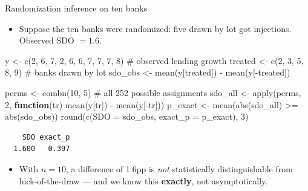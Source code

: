 \documentclass[
  11pt,
  ignorenonframetext,
  aspectratio=169,
]{beamer}
\newenvironment{Shaded}{\begin{snugshade}}{\end{snugshade}}
\newcommand{\AttributeTok}[1]{\textcolor[rgb]{0.40,0.45,0.13}{#1}}
\newcommand{\CommentTok}[1]{\textcolor[rgb]{0.37,0.37,0.37}{#1}}
\newcommand{\ControlFlowTok}[1]{\textcolor[rgb]{0.00,0.23,0.31}{\textbf{#1}}}
\newcommand{\DecValTok}[1]{\textcolor[rgb]{0.68,0.00,0.00}{#1}}
\newcommand{\FunctionTok}[1]{\textcolor[rgb]{0.28,0.35,0.67}{#1}}
\newcommand{\NormalTok}[1]{\textcolor[rgb]{0.00,0.23,0.31}{#1}}
\newcommand{\OtherTok}[1]{\textcolor[rgb]{0.00,0.23,0.31}{#1}}
\newcommand{\SpecialCharTok}[1]{\textcolor[rgb]{0.37,0.37,0.37}{#1}}
\providecommand{\tightlist}{%
  \setlength{\itemsep}{0pt}\setlength{\parskip}{0pt}}
\begin{document}
\begin{frame}[fragile]{Randomization inference on ten banks}
\protect{}\label{randomization-inference-on-ten-banks}
\begin{itemize}
\tightlist
\item
  Suppose the ten banks were randomized: five drawn by lot got
  injections. Observed SDO \(= 1.6\).
\end{itemize}

\begin{Shaded}
\begin{Highlighting}[]
\NormalTok{y }\OtherTok{\textless{}{-}} \FunctionTok{c}\NormalTok{(}\DecValTok{2}\NormalTok{, }\DecValTok{6}\NormalTok{, }\DecValTok{7}\NormalTok{, }\DecValTok{2}\NormalTok{, }\DecValTok{6}\NormalTok{, }\DecValTok{6}\NormalTok{, }\DecValTok{7}\NormalTok{, }\DecValTok{7}\NormalTok{, }\DecValTok{7}\NormalTok{, }\DecValTok{8}\NormalTok{)     }\CommentTok{\# observed lending growth}
\NormalTok{treated }\OtherTok{\textless{}{-}} \FunctionTok{c}\NormalTok{(}\DecValTok{2}\NormalTok{, }\DecValTok{3}\NormalTok{, }\DecValTok{5}\NormalTok{, }\DecValTok{8}\NormalTok{, }\DecValTok{9}\NormalTok{)              }\CommentTok{\# banks drawn by lot}
\NormalTok{sdo\_obs }\OtherTok{\textless{}{-}} \FunctionTok{mean}\NormalTok{(y[treated]) }\SpecialCharTok{{-}} \FunctionTok{mean}\NormalTok{(y[}\SpecialCharTok{{-}}\NormalTok{treated])}

\NormalTok{perms }\OtherTok{\textless{}{-}} \FunctionTok{combn}\NormalTok{(}\DecValTok{10}\NormalTok{, }\DecValTok{5}\NormalTok{)                     }\CommentTok{\# all 252 possible assignments}
\NormalTok{sdo\_all }\OtherTok{\textless{}{-}} \FunctionTok{apply}\NormalTok{(perms, }\DecValTok{2}\NormalTok{, }\ControlFlowTok{function}\NormalTok{(tr) }\FunctionTok{mean}\NormalTok{(y[tr]) }\SpecialCharTok{{-}} \FunctionTok{mean}\NormalTok{(y[}\SpecialCharTok{{-}}\NormalTok{tr]))}
\NormalTok{p\_exact }\OtherTok{\textless{}{-}} \FunctionTok{mean}\NormalTok{(}\FunctionTok{abs}\NormalTok{(sdo\_all) }\SpecialCharTok{\textgreater{}=} \FunctionTok{abs}\NormalTok{(sdo\_obs))}
\FunctionTok{round}\NormalTok{(}\FunctionTok{c}\NormalTok{(}\AttributeTok{SDO =}\NormalTok{ sdo\_obs, }\AttributeTok{exact\_p =}\NormalTok{ p\_exact), }\DecValTok{3}\NormalTok{)}
\end{Highlighting}
\end{Shaded}

\begin{verbatim}
    SDO exact_p 
  1.600   0.397 
\end{verbatim}

\begin{itemize}
\tightlist
\item
  With \(n = 10\), a difference of 1.6pp is \emph{not} statistically
  distinguishable from luck-of-the-draw --- and we know this
  \textbf{exactly}, not asymptotically.
\end{itemize}
\end{frame}
\end{document}
